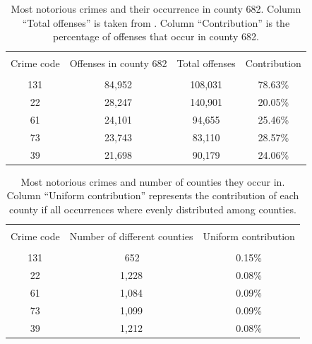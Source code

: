 \documentclass[11pt, english]{article}
\begin{document}
\begin{multicols}{2}
\begin{table}
	\caption{Most notorious crimes and their occurrence in county 682. Column ``Total offenses'' is taken from . Column ``Contribution'' is the percentage of offenses that occur in county 682.}
	\label{tab:notorious-crimes-county}
	\centering
	\begin{tabular}{cccc}
		\hline\hline
		\\[-1.5ex]
		Crime code		&	Offenses in county 682	&	Total offenses		&	Contribution	\\[0.5ex]\hline
		\\[-1.5ex]
		131				&	84,952					&	108,031				&	78.63\%			\\[0.2ex]
		22				&	28,247					&	140,901				&	20.05\%			\\[0.2ex]
		61				&	24,101					&	\hspace{1ex}94,655	&	25.46\%			\\[0.2ex]
		73				&	23,743					&	\hspace{1ex}83,110	&	28.57\%			\\[0.2ex]
		39				&	21,698					&	\hspace{1ex}90,179	&	24.06\%			\\[0.5ex]
		\hline\hline
	\end{tabular}
\end{table}

\begin{table}
	\caption{Most notorious crimes and number of counties they occur in. Column ``Uniform contribution'' represents the contribution of each county if all occurrences where evenly distributed among counties.}
	\label{tab:notorious-crimes-uniform-distribution}
	\centering
	\begin{tabular}{ccc}
		\hline\hline
		\\[-1.5ex]
		Crime code		&	Number of different counties	&	Uniform contribution	\\[0.5ex]\hline
		\\[-1.5ex]
		131				&	\hspace{1ex}\,652				&	0.15\%			\\[0.2ex]
		22				&	1,228							&	0.08\%			\\[0.2ex]
		61				&	1,084							&	0.09\%			\\[0.2ex]
		73				&	1,099							&	0.09\%			\\[0.2ex]
		39				&	1,212							&	0.08\%			\\[0.5ex]
		\hline\hline
	\end{tabular}
\end{table}

\end{multicols}
\end{document}
